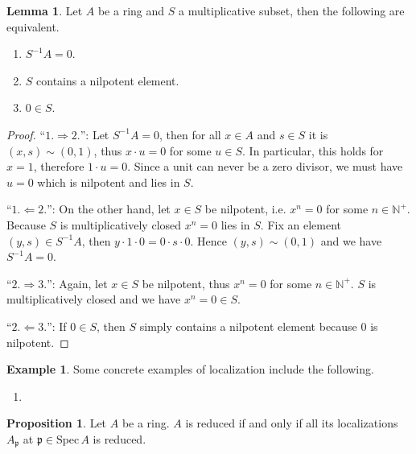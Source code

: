 \documentclass[a4paper]{book}
\theoremstyle{definition}
\newtheorem{example}{Example}[definition]
\newtheorem{lemma}[definition]{Lemma}
\newtheorem{proposition}[definition]{Proposition}
\begin{document}
\begin{thmbox}
    \begin{lemma}
        Let \(A\) be a ring and \(S\) a multiplicative subset, then the following are equivalent.
        \begin{enumerate}
            \item \(S^{-1}A = 0\).
            \item \(S\) contains a nilpotent element.
            \item \(0 \in S\).
        \end{enumerate}
    \end{lemma}
\end{thmbox}
\begin{proof}
    ``\(1. \Rightarrow 2.\)'': Let \(S^{-1}A = 0\), then for all \(x \in A\) and \(s \in S\) it is \((x, s) \sim (0, 1)\), thus \(x \cdot u = 0\) for some \(u \in S\). In particular, this holds for \(x = 1\), therefore \(1 \cdot u = 0\). Since a unit can never be a zero divisor, we must have \(u = 0\) which is nilpotent and lies in \(S\).

    ``\(1. \Leftarrow 2.\)'': On the other hand, let \(x \in S\) be nilpotent, i.e. \(x^n = 0\) for some \(n \in \mathbb{N}^+\). Because \(S\) is multiplicatively closed \(x^n = 0\) lies in \(S\). Fix an element \((y, s) \in S^{-1}A\), then \(y \cdot 1 \cdot 0 = 0 \cdot s \cdot 0\). Hence \((y, s) \sim (0, 1)\) and we have \(S^{-1}A = 0\).

    ``\(2. \Rightarrow 3.\)'': Again, let \(x \in S\) be nilpotent, thus \(x^n = 0\) for some \(n \in \mathbb{N}^+\). \(S\) is multiplicatively closed and we have \(x^n = 0 \in S\).

    ``\(2. \Leftarrow 3.\)'': If \(0 \in S\), then \(S\) simply contains a nilpotent element because \(0\) is nilpotent.
\end{proof}



\begin{example}
    Some concrete examples of localization include the following.
    \begin{enumerate}
        \item 
    \end{enumerate}
\end{example}


\begin{thmbox}
    \begin{proposition}
        Let \(A\) be a ring. \(A\) is reduced if and only if all its localizations \(A_\mathfrak{p}\) at \(\mathfrak{p} \in \mathrm{Spec} \, A\) is reduced.
    \end{proposition}
\end{thmbox}
\end{document}
